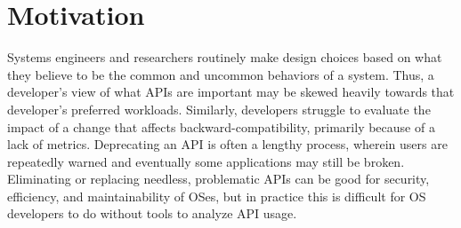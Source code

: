 \section{Motivation}
\label{sec:syspop:motivation}


Systems engineers and researchers routinely make design choices based on 
what they believe to be the common and uncommon behaviors of a system.
Thus, a developer's view of what APIs are important
may be skewed heavily towards that developer's preferred workloads.
Similarly, developers struggle to evaluate the impact of a 
change that affects backward-compatibility,
primarily because of a lack of metrics.
Deprecating an API is often a lengthy process, wherein
users are repeatedly warned 
and eventually some applications may still be broken.
Eliminating or replacing needless, problematic APIs 
can be good for security, efficiency, and maintainability of OSes,
but in practice this is difficult for OS developers to do without tools to analyze API usage.

